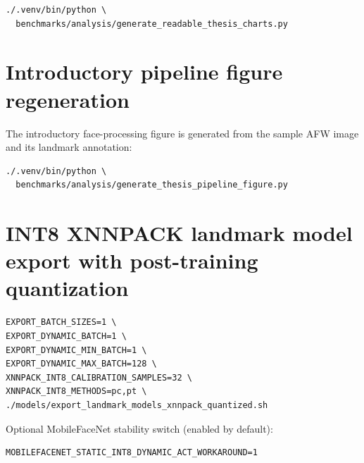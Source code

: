 \begin{verbatim}
./.venv/bin/python \
  benchmarks/analysis/generate_readable_thesis_charts.py
\end{verbatim}

\section{Introductory pipeline figure regeneration}

The introductory face-processing figure is generated from the sample AFW image
and its landmark annotation:

\begin{verbatim}
./.venv/bin/python \
  benchmarks/analysis/generate_thesis_pipeline_figure.py
\end{verbatim}

\section{INT8 XNNPACK landmark model export with post-training quantization}

\begin{verbatim}
EXPORT_BATCH_SIZES=1 \
EXPORT_DYNAMIC_BATCH=1 \
EXPORT_DYNAMIC_MIN_BATCH=1 \
EXPORT_DYNAMIC_MAX_BATCH=128 \
XNNPACK_INT8_CALIBRATION_SAMPLES=32 \
XNNPACK_INT8_METHODS=pc,pt \
./models/export_landmark_models_xnnpack_quantized.sh
\end{verbatim}

Optional MobileFaceNet stability switch (enabled by default):

\begin{verbatim}
MOBILEFACENET_STATIC_INT8_DYNAMIC_ACT_WORKAROUND=1
\end{verbatim}
